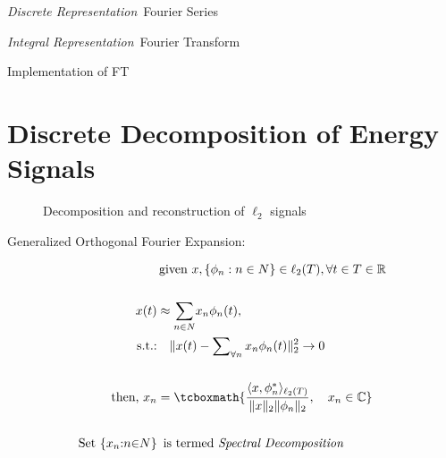 \documentclass[17pt,a4paper]{extarticle}
\title{\courseName}
\newcommand{\Real}{\mathbb{R}}\newcommand{\N}{\mathbb{N}}
\begin{document}
\maketitle
\thispagestyle{fancy}
\begin{list}{.-}{}
	\item \textsl{Discrete Representation}\, Fourier Series	 
	\item \textsl{Integral Representation}\, Fourier Transform
	\item Implementation of FT
\end{list}
\clearpage
\linenumbers
\section*{Discrete Decomposition of Energy Signals} 
\begin{wrapfigure}{r}{.51\textwidth}
	\centering
	
	\caption{Decomposition and reconstruction of $\ell _2$ signals} 
\end{wrapfigure}
Generalized Orthogonal Fourier Expansion:
\begin{linenomath*}
\begin{align*}
	& \,\textrm{given }x, \{\phi_{n}:n\in N\}\in \ell _2(T), \forall t\in T\in \Real\\
	\\
	x(t)&\approx{{\displaystyle\sum\limits_{n\in N}}
	x_{n}\phi_{n}(t)} ,\\
\textrm{s.t.:}& \quad \|x(t)-\displaystyle\sum\nolimits_{\forall n}x_{n}\phi_{n}(t)\|^{2}_2\to 0\\
&\\
\textrm{then, } x_n & = \tcboxmath{\frac{\langle x,\phi^{*}_{n}\rangle_{\ell_2\left(T\right)} }{\|x\| _2\|\phi_{n}\| _2},\quad x_n\in \mathbb{C}}\, \\ \\
\textrm{Set }\{x_n{:}n{\in} N\}& \,\textrm{ is termed \textit{Spectral Decomposition}}
\end{align*}
\end{linenomath*}
\cleardoublepage
\end{document}
